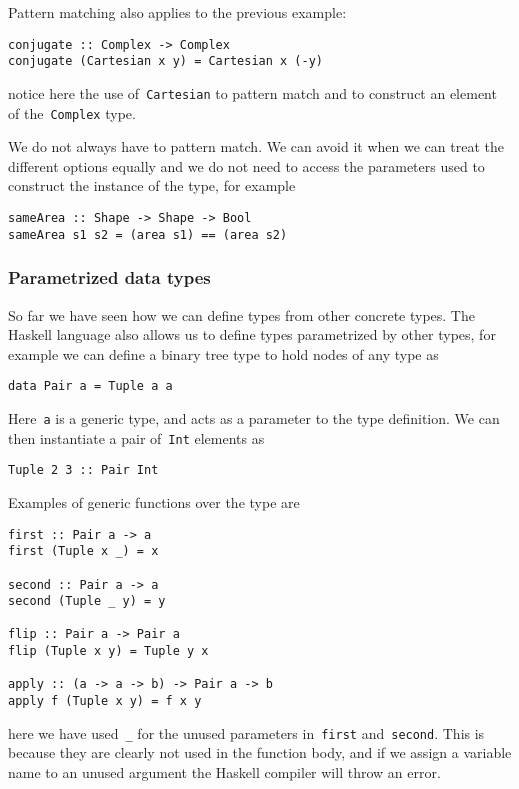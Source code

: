 \documentclass[a4paper]{article}
\theoremstyle{plain}
\theoremstyle{definition}
\begin{document}
Pattern matching also applies to the previous example:
\begin{verbatim}
conjugate :: Complex -> Complex
conjugate (Cartesian x y) = Cartesian x (-y)
\end{verbatim}
notice here the use of~\texttt{Cartesian} to pattern match and to
construct an element of the~\texttt{Complex} type.

We do not always have to pattern match. We can avoid it when we can treat the
different options equally and we do not need to access the parameters used to
construct the instance of the type, for example
\begin{verbatim}
sameArea :: Shape -> Shape -> Bool
sameArea s1 s2 = (area s1) == (area s2)
\end{verbatim}

\subsubsection{Parametrized data types}
So far we have seen how we can define types from other concrete types. The
Haskell language also allows us to define types parametrized by other types, for
example we can define a binary tree type to hold nodes of any type as
\begin{verbatim}
data Pair a = Tuple a a
\end{verbatim}
Here~\texttt{a} is a generic type, and acts as a parameter to the
type definition. We can then instantiate a pair
of~\texttt{Int} elements as
\begin{verbatim}
Tuple 2 3 :: Pair Int
\end{verbatim}

Examples of generic functions over the type are
\begin{verbatim}
first :: Pair a -> a
first (Tuple x _) = x

second :: Pair a -> a
second (Tuple _ y) = y

flip :: Pair a -> Pair a
flip (Tuple x y) = Tuple y x

apply :: (a -> a -> b) -> Pair a -> b
apply f (Tuple x y) = f x y
\end{verbatim}
here we have used~\texttt{_} for the unused parameters
in~\texttt{first} and~\texttt{second}. This is because
they are clearly not used in the function body, and if we assign a variable name
to an unused argument the Haskell compiler will throw an error.
\end{document}
